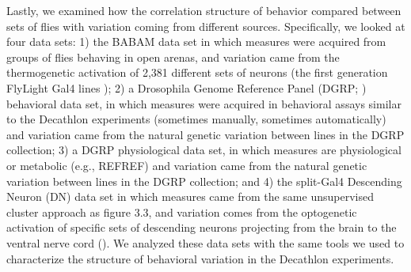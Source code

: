 \documentclass[12pt,letterpaper]{article}
\begin{document}
Lastly, we examined how the correlation structure of behavior compared between sets of flies with variation coming from different sources. Specifically, we looked at four data sets: 1) the BABAM data set \cite{Robie_Mapping_2017} in which measures were acquired from groups of flies behaving in open arenas, and variation came from the thermogenetic activation of 2,381 different sets of neurons (the first generation FlyLight Gal4 lines \cite{Jenett_A_2012}); 2) a Drosophila Genome Reference Panel (DGRP; \cite{Mackay_The_2012}) behavioral data set, in which measures were acquired in behavioral assays similar to the Decathlon experiments (sometimes manually, sometimes automatically) and variation came from the natural genetic variation between lines in the DGRP collection; 3) a DGRP physiological data set, in which measures are physiological or metabolic (e.g., REFREF) and variation came from the natural genetic variation between lines in the DGRP collection; and 4) the split-Gal4 Descending Neuron (DN) data set \cite{Cande_Optogenetic_2018} in which measures came from the same unsupervised cluster approach as figure 3.3, and variation comes from the optogenetic activation of specific sets of descending neurons projecting from the brain to the ventral nerve cord (\cite{Namiki_The_2018}). We analyzed these data sets with the same tools we used to characterize the structure of behavioral variation in the Decathlon experiments.
\end{document}
